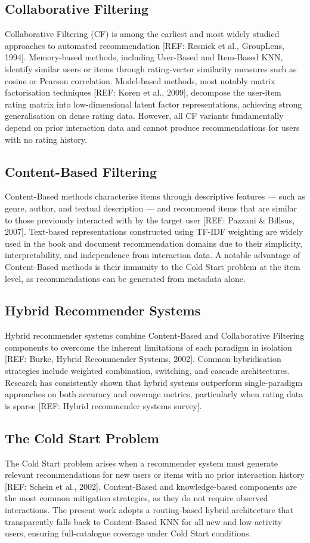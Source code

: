 \documentclass[12pt, a4paper]{article}
\begin{document}
\subsection{Collaborative Filtering}
Collaborative Filtering (CF) is among the earliest and most widely studied approaches
to automated recommendation [REF: Resnick et al., GroupLens, 1994].
Memory-based methods, including User-Based and Item-Based KNN, identify similar
users or items through rating-vector similarity measures such as cosine or Pearson correlation.
Model-based methods, most notably matrix factorisation techniques [REF: Koren et al., 2009],
decompose the user-item rating matrix into low-dimensional latent factor representations,
achieving strong generalisation on dense rating data.
However, all CF variants fundamentally depend on prior interaction data and
cannot produce recommendations for users with no rating history.

\subsection{Content-Based Filtering}
Content-Based methods characterise items through descriptive features
--- such as genre, author, and textual description --- and recommend items
that are similar to those previously interacted with by the target user
[REF: Pazzani \& Billsus, 2007].
Text-based representations constructed using TF-IDF weighting are widely used
in the book and document recommendation domains due to their simplicity,
interpretability, and independence from interaction data.
A notable advantage of Content-Based methods is their immunity to the Cold Start
problem at the item level, as recommendations can be generated from metadata alone.

\subsection{Hybrid Recommender Systems}
Hybrid recommender systems combine Content-Based and Collaborative Filtering
components to overcome the inherent limitations of each paradigm in isolation
[REF: Burke, Hybrid Recommender Systems, 2002].
Common hybridisation strategies include weighted combination, switching, and
cascade architectures.
Research has consistently shown that hybrid systems outperform single-paradigm
approaches on both accuracy and coverage metrics, particularly when rating data
is sparse [REF: Hybrid recommender systems survey].

\subsection{The Cold Start Problem}
The Cold Start problem arises when a recommender system must generate relevant
recommendations for new users or items with no prior interaction history
[REF: Schein et al., 2002].
Content-Based and knowledge-based components are the most common mitigation
strategies, as they do not require observed interactions.
The present work adopts a routing-based hybrid architecture that transparently
falls back to Content-Based KNN for all new and low-activity users,
ensuring full-catalogue coverage under Cold Start conditions.
\end{document}

